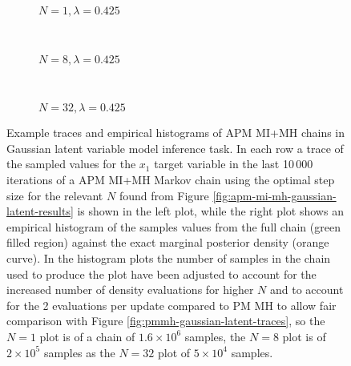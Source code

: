 \begin{figure}
\centering
\begin{subfigure}[b]{\linewidth}
\centering
  \vspace{-5mm}
  \caption{$N=1, \lambda=0.425$}
  \label{sfig:apm-mi-mh-1-gaussian-latent-trace}
\end{subfigure}
\\[3mm]
\begin{subfigure}[b]{\linewidth}
\centering
  \vspace{-5mm}
  \caption{$N=8, \lambda=0.425$}
  \label{sfig:apm-mi-mh-8-gaussian-latent-trace}
\end{subfigure}
\\[3mm]
\begin{subfigure}[b]{\linewidth}
\centering
  \vspace{-5mm}
  \caption{$N=32, \lambda=0.425$}
  \label{sfig:apm-mi-mh-32-gaussian-latent-trace}
\end{subfigure}
\caption[\acs{APM} \acs{MI}+\acs{MH} Gaussian model traces.]{
Example traces and empirical histograms of \ac{APM} \ac{MI}+\ac{MH} chains in Gaussian latent variable model inference task. In each row a trace of the sampled values for the $x_1$ target variable in the last 10\,000 iterations of a \ac{APM} \ac{MI}+\ac{MH} Markov chain using the optimal step size for the relevant $N$ found from Figure \ref{fig:apm-mi-mh-gaussian-latent-results} is shown in the left plot, while the right plot shows an empirical histogram of the samples values from the full chain (green filled region) against the exact marginal posterior density (orange curve). In the histogram plots the number of samples in the chain used to produce the plot have been adjusted to account for the increased number of density evaluations for higher $N$ and to account for the 2 evaluations per update compared to \ac{PM} \ac{MH} to allow fair comparison with Figure \ref{fig:pmmh-gaussian-latent-traces}, so the $N=1$ plot is of a chain of $1.6\times 10^6$ samples, the $N=8$ plot is of $2\times 10^5$ samples as the $N=32$ plot of $5 \times 10^4$ samples.}
\label{fig:apm-mi-mh-gaussian-latent-traces}
\end{figure}


